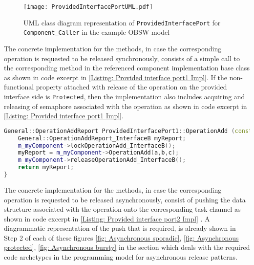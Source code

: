 \begin{figure}[h]
	\centering
	\texttt{[image: ProvidedInterfacePortUML.pdf]}
	\caption{UML class diagram representation of \texttt{Provided\allowbreak Interface\allowbreak Port} for \texttt{Component\allowbreak\_Caller} in the example OBSW model}
	\label{fig: Provided interface port UML}
\end{figure}   

The concrete implementation for the methods, in case the corresponding operation is requested to be released synchronously, consists of a simple call to the corresponding method in the referenced component implementation base class as shown in code excerpt in \cref{Listing: Provided interface port1 Impl}. If the non-functional property attached with release of the operation on the provided interface side is \texttt{Protected}, then the implementation also includes acquiring and releasing of semaphore associated with the operation as shown in code excerpt in \cref{Listing: Provided interface port1 Impl}. 

\begin{Listing}
\begin{lstlisting}[language=C++]
General::OperationAddReport ProvidedInterfacePort1::OperationAdd (const IntegerType& a,const IntegerType& b,IntegerType& c) {
	General::OperationAddReport_InterfaceB myReport;
	m_myComponent->lockOperationAdd_InterfaceB();
	myReport = m_myComponent->OperationAdd(a,b,c);
	m_myComponent->releaseOperationAdd_InterfaceB();
	return myReport;
}
\end{lstlisting}
\caption{Code excerpt from the generated code for operation \texttt{OperationAdd} access in \texttt{Provided\allowbreak Interface\allowbreak Port1} which is called synchronously and has \texttt{Protected} as a non-functional property attached to it}
\label{Listing: Provided interface port1 Impl}
\end{Listing}

The concrete implementation for the methods, in case the corresponding operation is requested to be released asynchronously, consist of pushing the data structure associated with the operation onto the corresponding task channel as shown in code excerpt in \cref{Listing: Provided interface port2 Impl} . A diagrammatic representation of the push that is required, is already shown in Step 2 of each of these figures \cref{fig: Asynchronous sporadic}, \cref{fig: Asynchronous protected}, \cref{fig: Asynchronous bursty} in the section which deals with the required code archetypes in the programming model for asynchronous release patterns.

